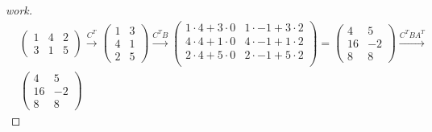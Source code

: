 \documentclass{article}
\begin{document}
\begin{enumerate}
    \begin{proof}[work]
        \begin{align*}
             & \begin{pmatrix}
                   1 & 4 & 2 \\
                   3 & 1 & 5
               \end{pmatrix} \xrightarrow{C^T}
            \begin{pmatrix}
                1 & 3 \\
                4 & 1 \\
                2 & 5
            \end{pmatrix}  \xrightarrow{C^TB}
            \begin{pmatrix}
                1 \cdot 4 + 3 \cdot 0 & 1 \cdot -1 + 3 \cdot 2 \\
                4 \cdot 4 + 1 \cdot 0 & 4 \cdot -1 + 1 \cdot 2 \\
                2 \cdot 4 + 5 \cdot 0 & 2 \cdot -1 + 5 \cdot 2 \\
            \end{pmatrix} =
            \begin{pmatrix}
                4  & 5  \\
                16 & -2 \\
                8  & 8
            \end{pmatrix} \xrightarrow{C^TBA^T} \\
             & \begin{pmatrix}
                   4  & 5  \\
                   16 & -2 \\
                   8  & 8
               \end{pmatrix}

\end{align*}
\end{proof}
\end{enumerate}
\end{document}
